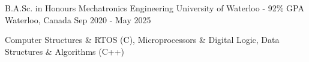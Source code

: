 

\begin{cventries}

  \cventry
    {B.A.Sc. in Honours Mechatronics Engineering} %
    {University of Waterloo - 92\% GPA} %
    {Waterloo, Canada} %
    {Sep 2020 - May 2025} %
    {
      \begin{cvitems}
        \item{Computer Structures \& RTOS (C), Microprocessors \& Digital Logic, Data Structures \& Algorithms (C++)}
      \end{cvitems}
    }
\end{cventries}
